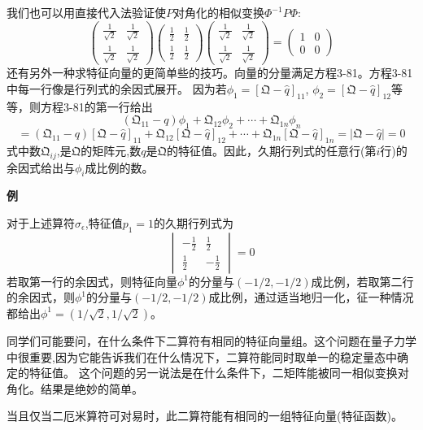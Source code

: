 我们也可以用直接代入法验证使$P$对角化的相似变换$\Phi^{-1}P\Phi$:
\[
\begin{pmatrix}
    \frac{1}{\sqrt{2}} & \frac{1}{\sqrt{2}} \\ \frac{1}{\sqrt{2}} & \frac{1}{\sqrt{2}}
\end{pmatrix} 
\begin{pmatrix}
    \frac{1}{2} & \frac{1}{2} \\ \frac{1}{2} & \frac{1}{2}
\end{pmatrix} 
\begin{pmatrix}
    \frac{1}{\sqrt{2}} & \frac{1}{\sqrt{2}} \\ \frac{1}{\sqrt{2}} & \frac{1}{\sqrt{2}}
\end{pmatrix} 
=
\begin{pmatrix}
    1 & 0 \\ 0 & 0
\end{pmatrix} 
\]
还有另外一种求特征向量的更简单些的技巧。向量的分量满足方程3-81。方程3-81中每一行像是行列式的余因式展开。
因为若$\phi_1=[\mathfrak{Q}-\hat{q}]_{11}$, $\phi_2=[\mathfrak{Q}-\hat{q}]_{12}$等等，则方程3-81的第一行给出
\[(\mathfrak{Q}_{11}-q)\phi_1+\mathfrak{Q}_{12}\phi_2+ \cdots +\mathfrak{Q}_{1n}\phi_n\]
\[=(\mathfrak{Q}_{11}-q)[\mathfrak{Q}-\hat{q}]_{11}+\mathfrak{Q}_{12}[\mathfrak{Q}-\hat{q}]_{12}+ \cdots +\mathfrak{Q}_{1n}[\mathfrak{Q}-\hat{q}]_{1n}=|\mathfrak{Q}-\hat{q}|=0 \tag{3-87}\]
式中数$\mathfrak{Q}_{ij}$,是$\mathfrak{Q}$的矩阵元,数$q$是$\mathfrak{Q}$的特征值。因此，久期行列式的任意行(第$i$行)的余因式给出与$\phi_i$成比例的数。

\textbf{例}

对于上述算符$\sigma_{\epsilon}$,特征值$p_1=1$的久期行列式为
\[
\begin{vmatrix}
    -\frac{1}{2} & \frac{1}{2} \\ \frac{1}{2} & -\frac{1}{2}
\end{vmatrix} 
=0   
\]
若取第一行的余因式，则特征向量$\phi^1$的分量与$(-1/2,-1/2)$成比例，若取第二行的余因式，则$\phi^1$的分量与$(-1/2,-1/2)$成比例，通过适当地归一化，征一种情况都给出$\phi^1=(1/\sqrt{2},1/\sqrt{2})$。

同学们可能要问，在什么条件下二算符有相同的特征向量组。这个问题在量子力学中很重要,因为它能告诉我们在什么情况下，二算符能同时取单一的稳定量态中确定的特征值。
这个问题的另一说法是在什么条件下，二矩阵能被同一相似变换对角化。结果是绝妙的简单。
\begin{theorem}
    当且仅当二厄米算符可对易时，此二算符能有相同的一组特征向量(特征函数)。
\end{theorem}

